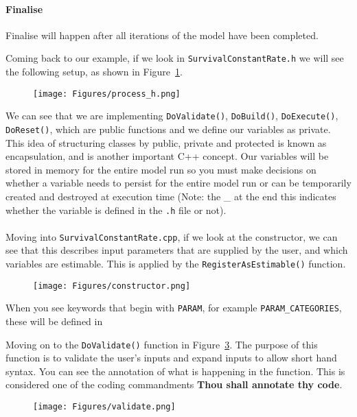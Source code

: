\paragraph*{Finalise}
Finalise will happen after all iterations of the model have been completed.
\pagebreak


Coming back to our example, if we look in \texttt{SurvivalConstantRate.h} we will {\color{red}see} the following setup, as shown in Figure~\ref{fig:process_h}.

\begin{figure}[!ht]
	\centering
	\texttt{[image: Figures/process\_h.png]}
	\caption{}\label{fig:process_h}
\end{figure}

We can see that we are implementing \texttt{DoValidate()}, \texttt{DoBuild()}, \texttt{DoExecute()}, \texttt{DoReset()}, which are public functions and we define our variables as private. This idea of structuring classes by public, private and protected is known as encapsulation, and is another important C++ concept. Our variables will be stored in memory for the entire model run so you must make decisions on whether a variable needs to persist for the entire model run or can be temporarily created and destroyed at execution time (Note: the \_ at the end this indicates whether the variable is defined in the \texttt{.h} file or not). 
\\\\
Moving into \texttt{SurvivalConstantRate.cpp}, if we look at the constructor, we can see that this describes input parameters that are supplied by the user, and which variables are estimable. This is applied by the \texttt{RegisterAsEstimable()} function.

\begin{figure}[!ht]
	\centering
	\texttt{[image: Figures/constructor.png]}
	\caption{}\label{fig:constructor}
\end{figure}
When you see keywords that begin with \texttt{PARAM}, for example \texttt{PARAM\_CATEGORIES}, these will be defined in 

Moving on to the \texttt{DoValidate()} function in Figure~\ref{fig:validate}. The purpose of this function is to validate the user's inputs and expand inputs to allow short hand syntax. You can see the annotation of what is happening in the function. This is considered one of the coding commandments \textbf{Thou shall annotate thy code}.
\begin{figure}[!ht]
	\centering
	\texttt{[image: Figures/validate.png]}
	\caption{}\label{fig:validate}
\end{figure}

